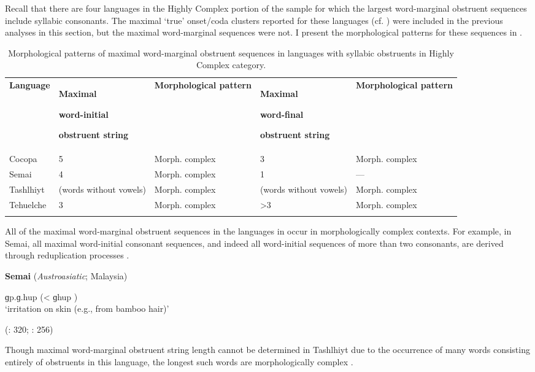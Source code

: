   Recall that there are four languages in the Highly Complex portion of the sample for which the largest word-marginal obstruent sequences include syllabic consonants. The maximal ‘true’ onset/coda clusters reported for these languages (cf. ) were included in the previous analyses in this section, but the maximal word-marginal sequences were not. I present the morphological patterns for these sequences in .

\begin{table}
\begin{tabularx}{\textwidth}{XXXXX}
\lsptoprule

\textbf{Language} & { \textbf{Maximal} }

{ \textbf{word-initial} }

 \textbf{obstruent string} & \textbf{Morphological pattern} & { \textbf{Maximal} }

{ \textbf{word-final} }

 \textbf{obstruent string} & \textbf{Morphological pattern}\\
Cocopa & 5 & Morph. complex & 3 & Morph. complex\\
Semai & 4 & Morph. complex & 1 & —\\
Tashlhiyt & (words without vowels) & Morph. complex & (words without vowels) & Morph. complex\\
Tehuelche & 3 & Morph. complex & >3 & Morph. complex\\
\lspbottomrule
\end{tabularx}
\caption{\label{tab:3.8}Morphological patterns of maximal word-marginal obstruent sequences in languages with syllabic obstruents in Highly Complex category.}
\end{table}

  All of the maximal word-marginal obstruent sequences in the languages in  occur in morphologically complex contexts. For example, in Semai, all maximal word-initial consonant sequences, and indeed all word-initial sequences of more than two consonants, are derived through reduplication processes .

\ea\label{ex:3.23}
  \textbf{Semai} (\textit{Austroasiatic}; Malaysia)

ɡp.ɡ.hup (< ɡhup )\\
\glt ‘irritation on skin (e.g., from bamboo hair)’

(\citealt{Sloan1988}: 320; \citealt{Diffloth1976a}: 256)
\z

Though maximal word-marginal obstruent string length cannot be determined in Tashlhiyt due to the occurrence of many words consisting entirely of obstruents in this language, the longest such words are morphologically complex .


